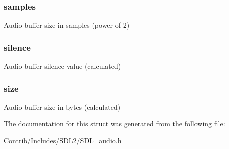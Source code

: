 \subsubsection[{\texorpdfstring{samples}{samples}}]{ samples}\hypertarget{struct_s_d_l___audio_spec_afe09cc5fd2bca18a01641bc94ff31b2c}{}\label{struct_s_d_l___audio_spec_afe09cc5fd2bca18a01641bc94ff31b2c}
Audio buffer size in samples (power of 2) 
\subsubsection[{\texorpdfstring{silence}{silence}}]{ silence}\hypertarget{struct_s_d_l___audio_spec_a9f3aae8ba0a529c3652087cb49ce6d11}{}\label{struct_s_d_l___audio_spec_a9f3aae8ba0a529c3652087cb49ce6d11}
Audio buffer silence value (calculated) 
\subsubsection[{\texorpdfstring{size}{size}}]{ size}\hypertarget{struct_s_d_l___audio_spec_a1338cce8a57eea552ed3ed77e28af0c0}{}\label{struct_s_d_l___audio_spec_a1338cce8a57eea552ed3ed77e28af0c0}
Audio buffer size in bytes (calculated) 

The documentation for this struct was generated from the following file\+:\begin{DoxyCompactItemize}
\item 
Contrib/\+Includes/\+S\+D\+L2/\hyperlink{_s_d_l__audio_8h}{S\+D\+L\+\_\+audio.\+h}\end{DoxyCompactItemize}
